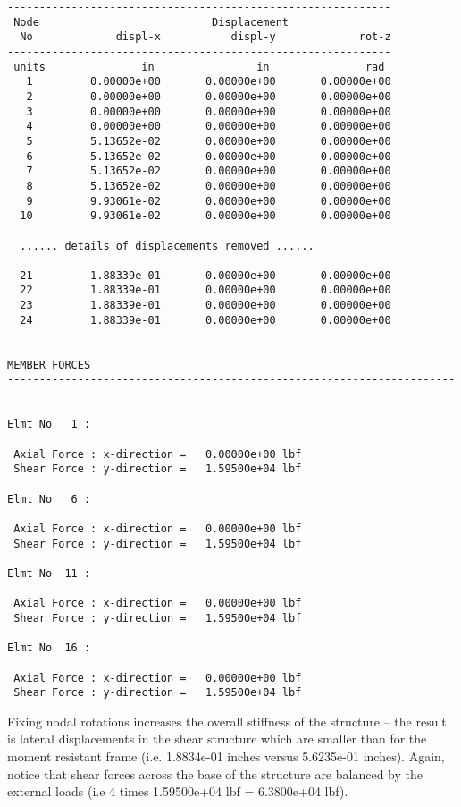 \begin{footnotesize}
\begin{verbatim}
------------------------------------------------------------
 Node                           Displacement
  No             displ-x           displ-y             rot-z
------------------------------------------------------------
 units               in                in               rad 
   1         0.00000e+00       0.00000e+00       0.00000e+00
   2         0.00000e+00       0.00000e+00       0.00000e+00
   3         0.00000e+00       0.00000e+00       0.00000e+00
   4         0.00000e+00       0.00000e+00       0.00000e+00
   5         5.13652e-02       0.00000e+00       0.00000e+00
   6         5.13652e-02       0.00000e+00       0.00000e+00
   7         5.13652e-02       0.00000e+00       0.00000e+00
   8         5.13652e-02       0.00000e+00       0.00000e+00
   9         9.93061e-02       0.00000e+00       0.00000e+00
  10         9.93061e-02       0.00000e+00       0.00000e+00

  ...... details of displacements removed ......

  21         1.88339e-01       0.00000e+00       0.00000e+00
  22         1.88339e-01       0.00000e+00       0.00000e+00
  23         1.88339e-01       0.00000e+00       0.00000e+00
  24         1.88339e-01       0.00000e+00       0.00000e+00


MEMBER FORCES 
------------------------------------------------------------------------------

Elmt No   1 : 

 Axial Force : x-direction =   0.00000e+00 lbf
 Shear Force : y-direction =   1.59500e+04 lbf

Elmt No   6 : 

 Axial Force : x-direction =   0.00000e+00 lbf
 Shear Force : y-direction =   1.59500e+04 lbf

Elmt No  11 : 

 Axial Force : x-direction =   0.00000e+00 lbf
 Shear Force : y-direction =   1.59500e+04 lbf

Elmt No  16 : 

 Axial Force : x-direction =   0.00000e+00 lbf
 Shear Force : y-direction =   1.59500e+04 lbf
\end{verbatim}
\end{footnotesize}

\vspace{0.15 in}\noindent
Fixing nodal rotations increases the overall stiffness of
the structure -- the result is lateral displacements 
in the shear structure which are smaller than for the moment
resistant frame (i.e. 1.8834e-01 inches versus 5.6235e-01 inches).
Again, notice that shear forces across the base of the structure are
balanced by the external loads (i.e 4 times 1.59500e+04 lbf = 6.3800e+04 lbf).

